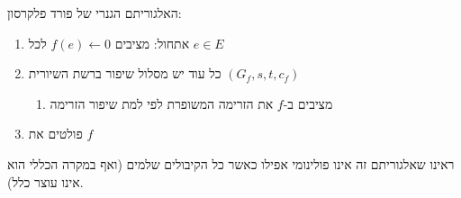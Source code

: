 האלגוריתם הגנרי של פורד פלקרסון:
\begin{enumerate}
\item
אתחול: מציבים 
$f(e) \leftarrow 0$
לכל
$e \in E$

\item
כל עוד יש מסלול שיפור ברשת השיורית
$(G_f, s, t, c_f)$
\begin{enumerate}
\item
מציבים ב-$f$ את הזרימה המשופרת לפי למת שיפור הזרימה
\end{enumerate}
\item
פולטים את $f$
\end{enumerate}

ראינו שאלגוריתם זה אינו פולינומי אפילו כאשר כל הקיבולים שלמים (ואף במקרה הכללי הוא אינו עוצר כלל).


